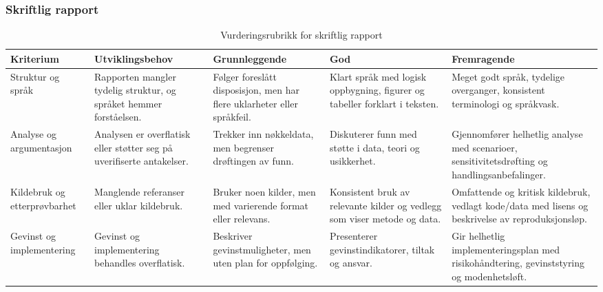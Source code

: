 \subsubsection{Skriftlig rapport}
\begin{table}[h]
    \centering
    \caption{Vurderingsrubrikk for skriftlig rapport}
    \label{tab:rubrikk-rapport}
    \begin{tabular}{p{2.8cm}p{3.0cm}p{3.0cm}p{3.0cm}p{3.0cm}}
        \toprule
        \textbf{Kriterium} & \textbf{Utviklingsbehov} & \textbf{Grunnleggende} & \textbf{God} & \textbf{Fremragende} \\
        \midrule
        Struktur og språk & Rapporten mangler tydelig struktur, og språket hemmer forståelsen. & Følger foreslått disposisjon, men har flere uklarheter eller språkfeil. & Klart språk med logisk oppbygning, figurer og tabeller forklart i teksten. & Meget godt språk, tydelige overganger, konsistent terminologi og språkvask. \\
        Analyse og argumentasjon & Analysen er overflatisk eller støtter seg på uverifiserte antakelser. & Trekker inn nøkkeldata, men begrenser drøftingen av funn. & Diskuterer funn med støtte i data, teori og usikkerhet. & Gjennomfører helhetlig analyse med scenarioer, sensitivitetsdrøfting og handlingsanbefalinger. \\
        Kildebruk og etterprøvbarhet & Manglende referanser eller uklar kildebruk. & Bruker noen kilder, men med varierende format eller relevans. & Konsistent bruk av relevante kilder og vedlegg som viser metode og data. & Omfattende og kritisk kildebruk, vedlagt kode/data med lisens og beskrivelse av reproduksjonsløp. \\
        Gevinst og implementering & Gevinst og implementering behandles overflatisk. & Beskriver gevinstmuligheter, men uten plan for oppfølging. & Presenterer gevinstindikatorer, tiltak og ansvar. & Gir helhetlig implementeringsplan med risikohåndtering, gevinststyring og modenhetsløft. \\
        \bottomrule
    \end{tabular}
\end{table}

